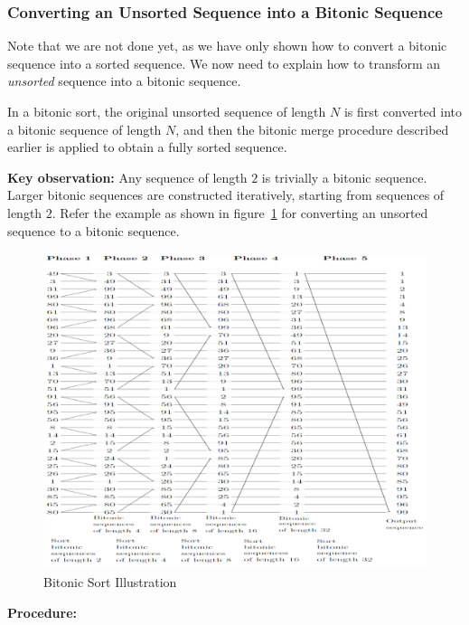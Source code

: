 \documentclass[12pt]{book}
\begin{document}
\subsubsection{Converting an Unsorted Sequence into a Bitonic Sequence}

Note that we are not done yet, as we have only shown how to convert a bitonic sequence into a sorted sequence. We now need to explain how to transform an \emph{unsorted} sequence into a bitonic sequence.

In a bitonic sort, the original unsorted sequence of length $N$ is first converted into a bitonic sequence of length $N$, and then the bitonic merge procedure described earlier is applied to obtain a fully sorted sequence.

\medskip
\noindent
\textbf{Key observation:} Any sequence of length $2$ is trivially a bitonic sequence. Larger bitonic sequences are constructed iteratively, starting from sequences of length $2$. Refer the example as shown in figure~\ref{fig:bitonicsort} for converting an unsorted sequence to a bitonic sequence.
\begin{figure}[ht]
    \centering
    \includegraphics[width=\linewidth]{images/BitonicSort.png}
    \caption{Bitonic Sort Illustration}
    \label{fig:bitonicsort}
\end{figure}
\medskip
\noindent
\textbf{Procedure:}
\end{document}
